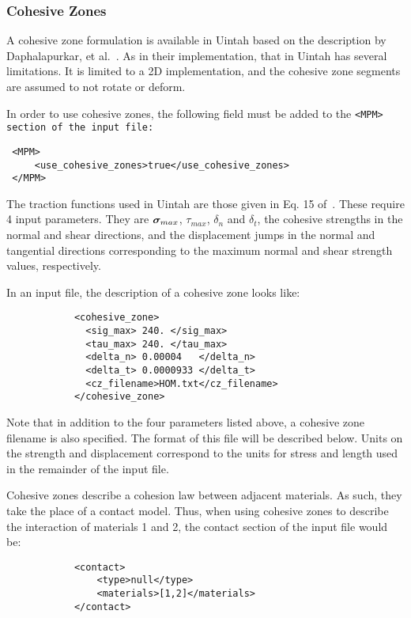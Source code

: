 \subsubsection{Cohesive Zones} \label{Sec:CohesiveZones}
A cohesive zone formulation is available in Uintah based on the description
by Daphalapurkar, et al.~\cite{Daphalapurkar}.  As in their implementation,
that in Uintah has several limitations.  It is limited to a 2D implementation,
and the cohesive zone segments are assumed to not rotate or deform.

In order to use cohesive zones, the following field must be added to the
\tt <MPM> \normalfont section of the input file:

\begin{Verbatim}
 <MPM>
     <use_cohesive_zones>true</use_cohesive_zones>
 </MPM>
\end{Verbatim}

The traction functions used in Uintah are those given in Eq. 15
of~\cite{Daphalapurkar}.  These require 4 input parameters.  They are
$\sig_{max}$, $\tau_{max}$, $\delta_n$ and $\delta_t$, the cohesive strengths
in the normal and shear directions, and the displacement jumps in the normal and
tangential directions corresponding to the maximum normal and shear strength
values, respectively.

In an input file, the description of a cohesive zone looks like:

\begin{Verbatim}
            <cohesive_zone>
              <sig_max> 240. </sig_max>
              <tau_max> 240. </tau_max>
              <delta_n> 0.00004   </delta_n>
              <delta_t> 0.0000933 </delta_t>
              <cz_filename>HOM.txt</cz_filename>
            </cohesive_zone>
\end{Verbatim}

Note that in addition to the four parameters listed above, a cohesive zone
filename is also specified.  The format of this file will be described below.
Units on the strength and displacement correspond to the units for
stress and length used in the remainder of the input file.

Cohesive zones describe a cohesion law between adjacent materials. As such,
they take the place of a contact model.  Thus, when using cohesive zones to
describe the interaction of materials 1 and 2, the contact section of the input
file would be:

\begin{Verbatim}
            <contact>
                <type>null</type>
                <materials>[1,2]</materials>
            </contact>
\end{Verbatim}

